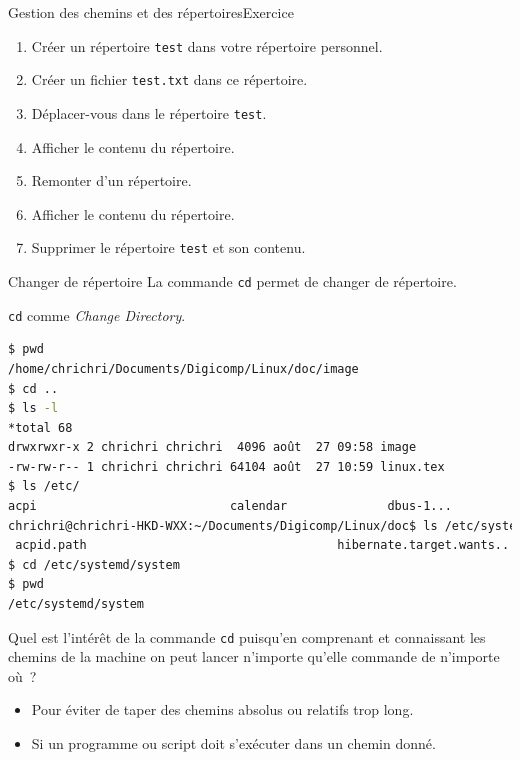 \documentclass{beamer}
\begin{document}
    \begin{frame}{Gestion des chemins et des répertoires}{Exercice \execcounterdispinc}
        \begin{enumerate}
            \item Créer un répertoire \lstinline{test} dans votre répertoire personnel.
            \item Créer un fichier \lstinline{test.txt} dans ce répertoire.
            \item Déplacer-vous dans le répertoire \lstinline{test}.
            \item Afficher le contenu du répertoire.
            \item Remonter d'un répertoire.
            \item Afficher le contenu du répertoire.
            \item Supprimer le répertoire \lstinline{test} et son contenu.
        \end{enumerate}
    \end{frame}


    \begin{frame}[fragile]{Changer de répertoire}
        La commande \lstinline{cd} permet de changer de répertoire.

        \lstinline{cd} comme \textit{Change Directory}.
        \begin{lstlisting}[language=bash,basicstyle=\tiny\ttfamily]
$ pwd
/home/chrichri/Documents/Digicomp/Linux/doc/image
$ cd ..
$ ls -l
*total 68
drwxrwxr-x 2 chrichri chrichri  4096 août  27 09:58 image
-rw-rw-r-- 1 chrichri chrichri 64104 août  27 10:59 linux.tex
$ ls /etc/
acpi                           calendar              dbus-1...
chrichri@chrichri-HKD-WXX:~/Documents/Digicomp/Linux/doc$ ls /etc/systemd/system
 acpid.path                                   hibernate.target.wants...
$ cd /etc/systemd/system
$ pwd
/etc/systemd/system
        \end{lstlisting}
        Quel est l'intérêt de la commande \lstinline{cd} puisqu'en comprenant et connaissant les chemins de la machine on peut lancer n'importe qu'elle commande de n'importe où~?
        \pause
        \begin{itemize}
            \item Pour éviter de taper des chemins absolus ou relatifs trop long.
            \item Si un programme ou script doit s'exécuter dans un chemin donné.
        \end{itemize}
    \end{frame}
\end{document}
